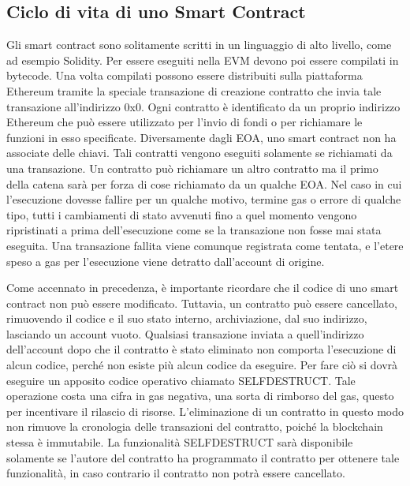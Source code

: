 \subsection{Ciclo di vita di uno Smart Contract}
Gli smart contract sono solitamente scritti in un linguaggio di alto livello, come ad esempio Solidity. Per essere eseguiti nella EVM devono poi essere compilati in bytecode. Una volta compilati possono essere distribuiti sulla piattaforma Ethereum tramite la speciale transazione di creazione contratto che invia tale transazione all'indirizzo 0x0. Ogni contratto è identificato da un proprio indirizzo Ethereum che può essere utilizzato per l'invio di fondi o per richiamare le funzioni in esso specificate. Diversamente dagli EOA, uno smart contract non ha associate delle chiavi. Tali contratti vengono eseguiti solamente se richiamati da una transazione. Un contratto può richiamare un altro contratto ma il primo della catena sarà per forza di cose richiamato da un qualche EOA. Nel caso in cui l'esecuzione dovesse fallire per un qualche motivo, termine gas o errore di qualche tipo, tutti i cambiamenti di stato avvenuti fino a quel momento vengono ripristinati a prima dell'esecuzione come se la transazione non fosse mai stata eseguita. Una transazione fallita viene comunque registrata come tentata, e l'etere speso a gas per l'esecuzione viene detratto dall'account di origine. 

Come accennato in precedenza, è importante ricordare che il codice di uno smart contract non può essere modificato. Tuttavia, un contratto può essere cancellato, rimuovendo il codice e il suo stato interno, archiviazione, dal suo indirizzo, lasciando un account vuoto. Qualsiasi transazione inviata a quell'indirizzo dell'account dopo che il contratto è stato eliminato non comporta l'esecuzione di alcun codice, perché non esiste più alcun codice da eseguire. Per fare ciò si dovrà eseguire un apposito codice operativo chiamato SELFDESTRUCT. Tale operazione costa una cifra in gas negativa, una sorta di rimborso del gas, questo per incentivare il rilascio di risorse. L'eliminazione di un contratto in questo modo non rimuove la cronologia delle transazioni del contratto, poiché la blockchain stessa è immutabile. La funzionalità SELFDESTRUCT sarà disponibile solamente se l'autore del contratto ha programmato il contratto per ottenere tale funzionalità, in caso contrario il contratto non potrà essere cancellato.

